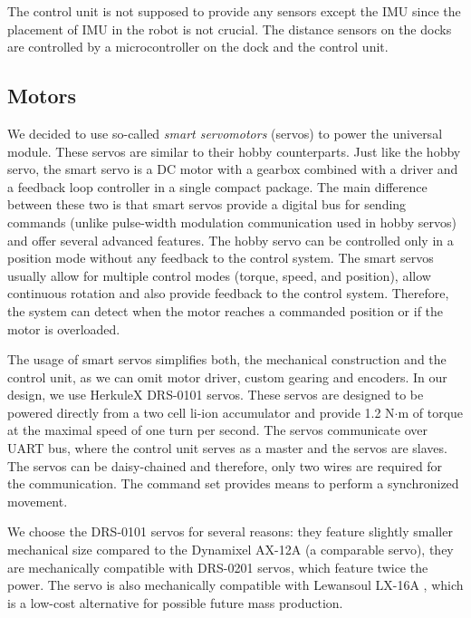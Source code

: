 The control unit is not supposed to provide any sensors except the IMU since the
placement of IMU in the robot is not crucial. The distance sensors on the docks
are controlled by a microcontroller on the dock and the control unit.


\subsection{Motors}

We decided to use so-called \emph{smart servomotors} (servos) to power the
universal module. These servos are similar to their hobby counterparts. Just
like the hobby servo, the smart servo is a DC motor with a gearbox combined with
a driver and a feedback loop controller in a single compact package. The main
difference between these two is that smart servos provide a digital bus for
sending commands (unlike pulse-width modulation communication used in hobby
servos) and offer several advanced features. The hobby servo can be controlled
only in a position mode without any feedback to the control system. The smart
servos usually allow for multiple control modes (torque, speed, and position),
allow continuous rotation and also provide feedback to the control system.
Therefore, the system can detect when the motor reaches a commanded position or
if the motor is overloaded.

The usage of smart servos simplifies both, the mechanical construction and the
control unit, as we can omit motor driver, custom gearing and encoders. In our
design, we use HerkuleX DRS-0101 \cite{noauthor_herkulex_nodate} servos. These
servos are designed to be powered directly from a two cell li-ion accumulator
and provide 1.2 N$\cdot$m of torque at the maximal speed of one turn per second.
The servos communicate over UART bus, where the control unit serves as a master
and the servos are slaves. The servos can be daisy-chained and therefore, only
two wires are required for the communication. The command set provides means to
perform a synchronized movement.

We choose the DRS-0101 servos for several reasons: they feature slightly smaller
mechanical size compared to the Dynamixel AX-12A \cite{noauthor_dynamixel_2006}
(a comparable servo), they are mechanically compatible with DRS-0201
\cite{noauthor_herkulex_nodate} servos, which feature twice the power. The servo
is also mechanically compatible with Lewansoul LX-16A
\cite{noauthor_lx-16a_2018}, which is a low-cost alternative for possible future
mass production.


